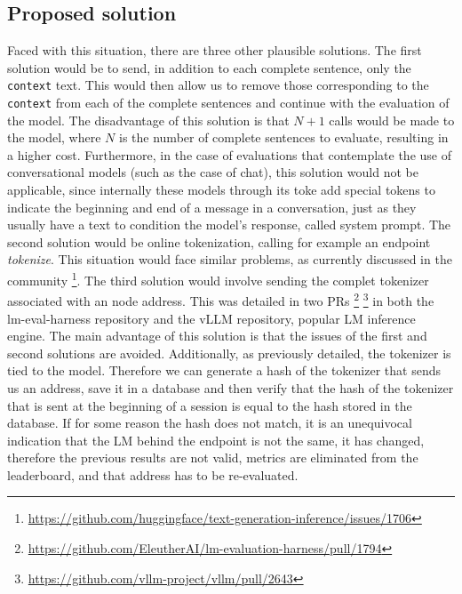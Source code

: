 \subsection{Proposed solution}\label{subsec:b3}

Faced with this situation, there are three other plausible solutions. 
The first solution would be to send, in addition to each complete sentence, only the \texttt{context} text. 
This would then allow us to remove those corresponding to the \texttt{context} from each of the complete sentences and continue with the evaluation of the model. 
The disadvantage of this solution is that $N+1$ calls would be made to the model, where $N$ is the number of complete sentences to evaluate, resulting in a higher cost. 
Furthermore, in the case of evaluations that contemplate the use of conversational models (such as the case of chat), this solution would not be applicable, since internally these models through its toke add special tokens to indicate the beginning and end of a message in a conversation, just as they usually have a text to condition the model's response, called system prompt. 
The second solution would be online tokenization, calling for example an endpoint \emph{tokenize}. 
This situation would face similar problems, as currently discussed in the community \footnote{\url{https://github.com/huggingface/text-generation-inference/issues/1706}}. 
The third solution would involve sending the complet tokenizer associated with an node address. 
This was detailed in two PRs \footnote{\url{https://github.com/EleutherAI/lm-evaluation-harness/pull/1794}} \footnote{\url{https://github.com/vllm-project/vllm/pull/2643}} in both the lm-eval-harness repository and the vLLM repository, popular \gls{LM} inference engine. 
The main advantage of this solution is that the issues of the first and second solutions are avoided. 
Additionally, as previously detailed, the tokenizer is tied to the model. 
Therefore we can generate a hash of the tokenizer that sends us an address, save it in a database and then verify that the hash of the tokenizer that is sent at the beginning of a session is equal to the hash stored in the database. 
If for some reason the hash does not match, it is an unequivocal indication that the \gls{LM} behind the endpoint is not the same, it has changed, therefore the previous results are not valid, metrics are eliminated from the leaderboard, and that address has to be re-evaluated. 
